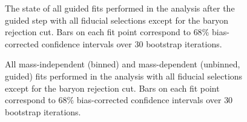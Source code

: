 \begin{figure}[htbp]
    \centering
    \begin{subfigure}{0.45\textwidth}
        
    \end{subfigure}
    \vspace{1em}
    \begin{subfigure}{0.45\textwidth}
        
    \end{subfigure}
    \caption{The state of all guided fits performed in the analysis after the guided step with all fiducial selections except for the baryon rejection cut. Bars on each fit point correspond to $68\%$ bias-corrected confidence intervals over $ 30 $ bootstrap iterations.}
    \label{fig:guided-fit-all-no-baryon-rejection}
\end{figure}

\begin{figure}[htbp]
    \centering
    \begin{subfigure}{0.45\textwidth}
        
    \end{subfigure}
    \vspace{1em}
    \begin{subfigure}{0.45\textwidth}
        
    \end{subfigure}
    \caption{All mass-independent (binned) and mass-dependent (unbinned, guided) fits performed in the analysis with all fiducial selections except for the baryon rejection cut. Bars on each fit point correspond to $68\%$ bias-corrected confidence intervals over $ 30 $ bootstrap iterations.}
    \label{fig:unbinned-guided-fit-all-no-baryon-rejection}
\end{figure}
